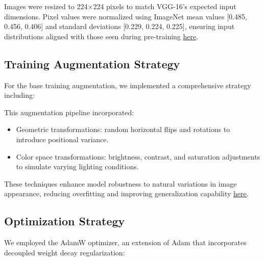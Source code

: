 \documentclass[a4paper,12pt]{article}
\begin{document}
Images were resized to 224×224 pixels to match VGG-16's expected input dimensions. Pixel values were normalized using ImageNet mean values [0.485, 0.456, 0.406] and standard deviations [0.229, 0.224, 0.225], ensuring input distributions aligned with those seen during pre-training \href{https://openaccess.thecvf.com/content_cvpr_2016/papers/He_Deep_Residual_Learning_CVPR_2016_paper.pdf}{here}.

\subsection{Training Augmentation Strategy}
For the base training augmentation, we implemented a comprehensive strategy including:


This augmentation pipeline incorporated:
\begin{itemize}
    \item Geometric transformations: random horizontal flips and rotations to introduce positional variance.
    \item Color space transformations: brightness, contrast, and saturation adjustments to simulate varying lighting conditions.
\end{itemize}

These techniques enhance model robustness to natural variations in image appearance, reducing overfitting and improving generalization capability \href{https://arxiv.org/abs/1712.04621}{here}.


\subsection{Optimization Strategy}
We employed the AdamW optimizer, an extension of Adam that incorporates decoupled weight decay regularization:

\end{document}
